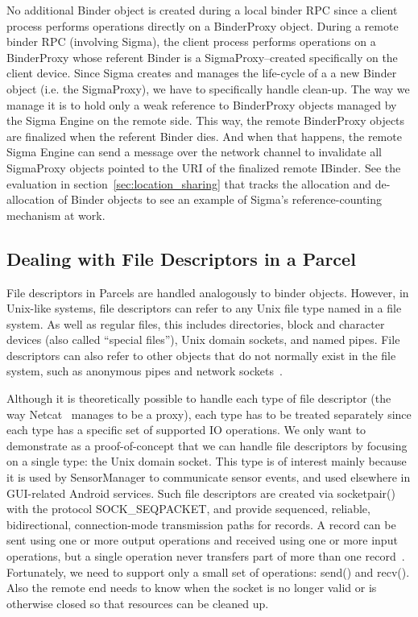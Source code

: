\documentclass[prodmode]{acmlarge}
\begin{document}
No additional Binder object is created during a local binder RPC since a client process performs operations directly on a BinderProxy object. During a remote binder RPC (involving Sigma), the client process performs operations on a BinderProxy whose referent Binder is a SigmaProxy--created specifically on the client device. Since Sigma creates and manages the life-cycle of a a new Binder object (i.e. the SigmaProxy), we have to specifically handle clean-up. The way we manage it is to hold only a weak reference to BinderProxy objects managed by the Sigma Engine on the remote side. This way, the remote BinderProxy objects are finalized when the referent Binder dies. And when that happens, the remote Sigma Engine can send a message over the network channel to invalidate all SigmaProxy objects pointed to the URI of the finalized remote IBinder. See the evaluation in section~\ref{sec:location_sharing} that tracks the allocation and de-allocation of Binder objects to see an example of Sigma's reference-counting mechanism at work.

\subsection{Dealing with File Descriptors in a Parcel}
File descriptors in Parcels are handled analogously to binder objects. However, in Unix-like systems, file descriptors can refer to any Unix file type named in a file system. As well as regular files, this includes directories, block and character devices (also called ``special files''), Unix domain sockets, and named pipes. File descriptors can also refer to other objects that do not normally exist in the file system, such as anonymous pipes and network sockets~\cite{UnixDomainSocket}.

Although it is theoretically possible to handle each type of file descriptor (the way Netcat~\cite{NetCatProxy} manages to be a proxy), each type has to be treated separately since each type has a specific set of supported IO operations. We only want to demonstrate as a proof-of-concept that we can handle file descriptors by focusing on a single type: the Unix domain socket. This type is of interest mainly because it is used by SensorManager to communicate sensor events, and used elsewhere in GUI-related Android services. Such file descriptors are created via socketpair() with the protocol SOCK\_SEQPACKET, and provide sequenced, reliable, bidirectional, connection-mode transmission paths for records. A record can be sent using one or more output operations and received using one or more input operations, but a single operation never transfers part of more than one record~\cite{SocketManPage}. Fortunately, we need to support only a small set of operations: send() and recv(). Also the remote end needs to know when the socket is no longer valid or is otherwise closed so that resources can be cleaned up.
\end{document}
